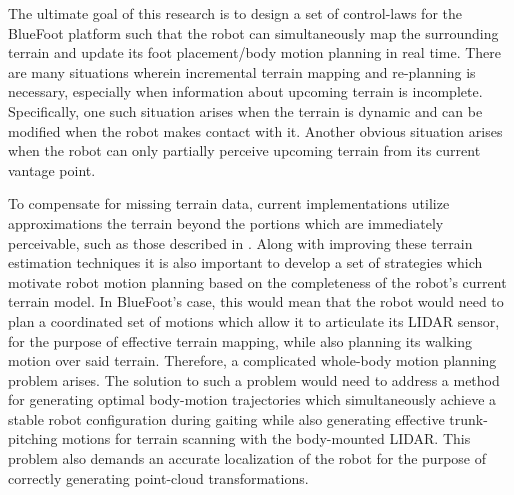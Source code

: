 	The ultimate goal of this research is to design a set of control-laws for the BlueFoot platform such that the robot can simultaneously map the surrounding terrain and update its foot placement/body motion planning in real time. There are many situations wherein incremental terrain mapping and re-planning is necessary, especially when information about upcoming terrain is incomplete. Specifically, one such situation arises when the terrain is dynamic and can be modified when the robot makes contact with it. Another obvious situation arises when the robot can only partially perceive upcoming terrain from its current vantage point.


	To compensate for missing terrain data, current implementations utilize approximations the terrain beyond the portions which are immediately perceivable, such as those described in \cite{Kolter2009}. Along with improving these terrain estimation techniques it is also important to develop a set of strategies which motivate robot motion planning based on the completeness of the robot's current terrain model. In BlueFoot's case, this would mean that the robot would need to plan a coordinated set of motions which allow it to articulate its LIDAR sensor, for the purpose of effective terrain mapping, while also planning its walking motion over said terrain. Therefore, a complicated whole-body motion planning problem arises. The solution to such a problem would need to address a method for generating optimal body-motion trajectories which simultaneously achieve a stable robot configuration during gaiting while also generating effective trunk-pitching motions for terrain scanning with the body-mounted LIDAR. This problem also demands an accurate localization of the robot for the purpose of correctly generating point-cloud transformations. %


